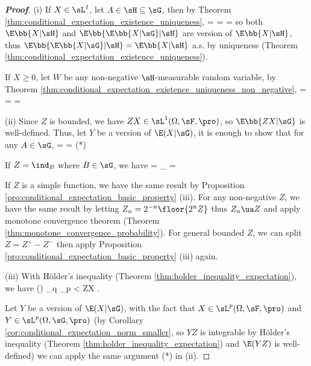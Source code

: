 \begin{proof}[\bf Proof]
\ben
\item [(i)] If $X\in \sL^1$, let $A \in \sH\subseteq \sG$, then by Theorem \ref{thm:conditional_expectation_existence_uniqueness},
\be
\E{} = \E{} = \E{} = \E{}
\ee
so both $\E\bb{X |\sH}$ and $\E\bb{\E\bb{X |\sG} |\sH}$ are version of $\E\bb{X |\sH}$, thus $\E\bb{\E\bb{X |\sG} |\sH} = \E\bb{X |\sH}$ a.s. by uniqueness (Theorem \ref{thm:conditional_expectation_existence_uniqueness}).

If $X\geq 0$, let $W$ be any non-negative $\sH$-measurable random variable, by Theorem \ref{thm:conditional_expectation_existence_uniqueness_non_negative},
\be
\E{} = \E{} = \E{} = \E{}
\ee

\item [(ii)] Since $Z$ is bounded, we have $ZX\in \sL^1(\Omega,\sF,\pro)$, so $\E\bb{ZX|\sG}$ is well-defined. Thus, let $Y$ be a version of $\E(X|\sG)$, it is enough to show that for any $A\in \sG$,
\be
\E{} = \E {}  \E {} = \E{} \quad \quad(*)
\ee

If $Z = \ind_B$ where $B\in \sG$, we have
\be
\E {} = _{} = \E {}
\ee

If $Z$ is a simple function, we have the same result by Proposition \ref{pro:conditional_expectation_basic_property} (iii). For any non-negative $Z$, we have the same result by letting $Z_n = 2^{-n}\floor{2^n Z}$ thus $Z_n \ua Z$ and apply monotone convergence theorem (Theorem \ref{thm:monotone_convergence_probability}). For general bounded $Z$, we can split $Z = Z^+ - Z^-$ then apply Proposition \ref{pro:conditional_expectation_basic_property} (iii) again.

\item [(iii)] With H\"older's inequality (Theorem \ref{thm:holder_inequality_expectation}), we have
\be
\E() \leq {}_q _p < \infty \quad\ra\quad ZX .
\ee

Let $Y$ be a version of $\E(X|\sG)$, with the fact that $X\in \sL^p(\Omega,\sF,\pro)$ and $Y\in \sL^p(\Omega,\sG,\pro)$ (by Corollary \ref{cor:conditional_expectation_norm_smaller}, so $YZ$ is integrable by H\"older's inequality (Theorem \ref{thm:holder_inequality_expectation}) and $\E(YZ)$ is well-defined) we can apply the same argument (*) in (ii).


\end{proof}
